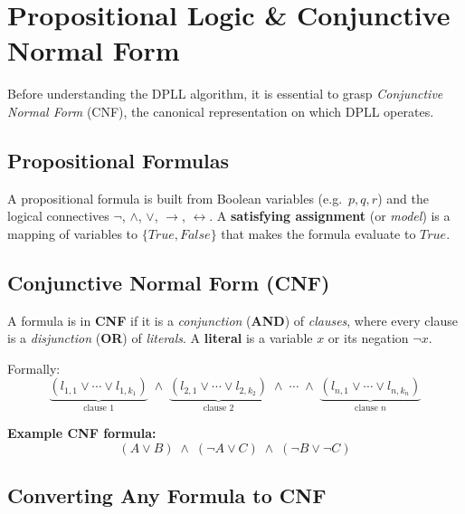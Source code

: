 \documentclass[11pt, a4paper]{article}
\begin{document}
\section{Propositional Logic \& Conjunctive Normal Form}

Before understanding the DPLL algorithm, it is essential to grasp
\emph{Conjunctive Normal Form} (CNF), the canonical representation on which
DPLL operates.

\subsection{Propositional Formulas}

A propositional formula is built from Boolean variables (e.g.\ $p, q, r$)
and the logical connectives $\lnot$, $\land$, $\lor$, $\rightarrow$,
$\leftrightarrow$.
A \textbf{satisfying assignment} (or \emph{model}) is a mapping of variables
to $\{\textit{True},\textit{False}\}$ that makes the formula evaluate to
$\textit{True}$.

\subsection{Conjunctive Normal Form (CNF)}

\begin{tcolorbox}[keystyle]
A formula is in \textbf{CNF} if it is a \emph{conjunction} (\textbf{AND}) of
\emph{clauses}, where every clause is a \emph{disjunction} (\textbf{OR}) of
\emph{literals}.
A \textbf{literal} is a variable $x$ or its negation $\lnot x$.
\end{tcolorbox}

\vspace{0.5em}
Formally:
\[
  \underbrace{(l_{1,1} \lor \cdots \lor l_{1,k_1})}_{\text{clause }1}
  \;\land\;
  \underbrace{(l_{2,1} \lor \cdots \lor l_{2,k_2})}_{\text{clause }2}
  \;\land\;\cdots\;\land\;
  \underbrace{(l_{n,1} \lor \cdots \lor l_{n,k_n})}_{\text{clause }n}
\]

\textbf{Example CNF formula:}
\[
  (A \lor B)\;\land\;(\lnot A \lor C)\;\land\;(\lnot B \lor \lnot C)
\]

\subsection{Converting Any Formula to CNF}
\end{document}
